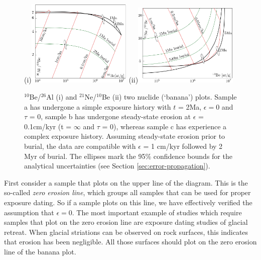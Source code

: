 \documentclass{book}
\newif\ifpdf
\begin{document}
\begin{figure}[!ht]
  \centering
  \ifpdf
  \def\svgwidth{.8\textwidth}
  ~~(i)~\\
  \def\svgwidth{.8\textwidth}
  (ii)
  \else
  (i)\includegraphics[width=5cm]{AlBe.png}
  (ii)\includegraphics[width=5cm]{NeBe.png}
  \fi
  \caption{$^{10}$Be/$^{26}$Al (i) and $^{21}$Ne/$^{10}$Be (ii) two
    nuclide (`banana') plots. Sample a has undergone a simple exposure
    history with $t$ = 2Ma, $\epsilon = 0$ and $\tau$ = 0, sample b has
    undergone steady-state erosion at $\epsilon$ = 0.1cm/kyr (t =
    $\infty$ and $\tau$ = 0), whereas sample c has experience a complex
    exposure history. Assuming steady-state erosion prior to burial, the
    data are compatible with $\epsilon$ = 1 cm/kyr followed by 2 Myr of
    burial. The ellipses mark the 95\% confidence bounds for the
    analytical uncertainties (see Section \ref{sec:error-propagation}).}
  \label{fig:banana}
\end{figure}

First consider a sample that plots on the upper line of the
diagram. This is the so-called \emph{zero erosion line}, which groups
all samples that can be used for proper exposure dating. So if a
sample plots on this line, we have effectively verified the assumption
that $\epsilon=0$.  The most important example of studies which
require samples that plot on the zero erosion line are exposure dating
studies of glacial retreat. When glacial striations can be observed on
rock surfaces, this indicates that erosion has been negligible. All
those surfaces should plot on the zero erosion line of the banana
plot.\\
\end{document}
